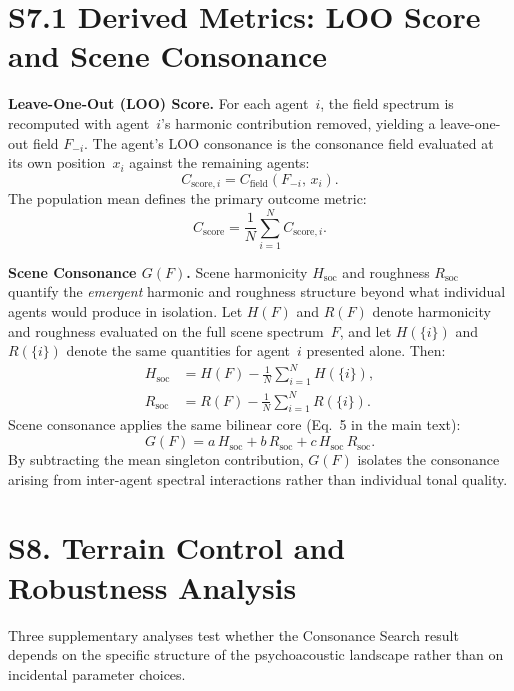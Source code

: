 \documentclass[letterpaper]{article}
\begin{document}
\section{S7.1 Derived Metrics: LOO Score and Scene Consonance}

\noindent\textbf{Leave-One-Out (LOO) Score.}
For each agent~$i$, the field spectrum is recomputed with agent~$i$'s harmonic contribution removed, yielding a leave-one-out field $F_{-i}$.
The agent's LOO consonance is the consonance field evaluated at its own position~$x_i$ against the remaining agents:
\begin{equation}
C_{\text{score},i} = C_{\text{field}}(F_{-i},\, x_i).
\end{equation}
The population mean defines the primary outcome metric:
\begin{equation}
C_{\text{score}} = \frac{1}{N}\sum_{i=1}^{N} C_{\text{score},i}.
\end{equation}

\noindent\textbf{Scene Consonance $G(F)$.}
Scene harmonicity $H_{\text{soc}}$ and roughness $R_{\text{soc}}$ quantify the \emph{emergent} harmonic and roughness structure beyond what individual agents would produce in isolation.
Let $H(F)$ and $R(F)$ denote harmonicity and roughness evaluated on the full scene spectrum~$F$, and let $H(\{i\})$ and $R(\{i\})$ denote the same quantities for agent~$i$ presented alone.
Then:
\begin{align}
H_{\text{soc}} &= H(F) - \frac{1}{N}\sum_{i=1}^{N} H(\{i\}),\\
R_{\text{soc}} &= R(F) - \frac{1}{N}\sum_{i=1}^{N} R(\{i\}).
\end{align}
Scene consonance applies the same bilinear core (Eq.~5 in the main text):
\begin{equation}
G(F) = a\,H_{\text{soc}} + b\,R_{\text{soc}} + c\,H_{\text{soc}}\,R_{\text{soc}}.
\end{equation}
By subtracting the mean singleton contribution, $G(F)$ isolates the consonance arising from inter-agent spectral interactions rather than individual tonal quality.

\section{S8. Terrain Control and Robustness Analysis}

Three supplementary analyses test whether the Consonance Search result depends on the specific structure of the psychoacoustic landscape rather than on incidental parameter choices.
\end{document}
